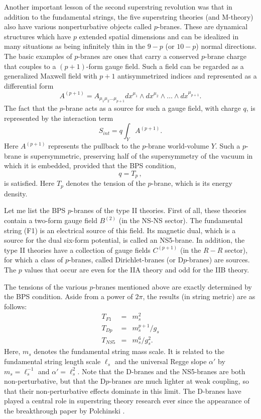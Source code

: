 \documentclass[a4paper,12pt]{article}
\begin{document}
Another important lesson of the second superstring revolution was
that in addition to the fundamental strings, the five superstring
theories (and M-theory) also have various nonperturbative objects
called $p$-branes.  These are dynamical structures which have $p$
extended spatial dimensions and can be idealized in many
situations as being infinitely thin in the $9 - p$ (or $10-p$)
normal directions. The basic examples of $p$-branes are ones that
carry a conserved $p$-brane charge that couples to a $(p +
1)$-form gauge field. Such a field can be regarded as a
generalized Maxwell field with $p+1$ antisymmetrized indices and
represented as a differential form
\begin{equation}
A^{(p+1)} = A_{\mu_{1}\mu_{2}\ldots \mu_{p+1}} dx^{\mu_{1}} \wedge dx^{\mu_{2}}
\wedge\ldots \wedge dx^{\mu_{p+1}}.
\end{equation}
The fact that the $p$-brane acts as a source for such a gauge field, with
charge $q$, is represented by the interaction term
\begin{equation}
S_{int} = q \int_Y A^{(p + 1)}.
\end{equation}
Here $A^{(p+1)}$ represents the pullback to the $p$-brane
world-volume $Y$. Such a $p$-brane is supersymmetric, preserving
half of the supersymmetry of the vacuum in which it is embedded,
provided that the BPS condition,
\begin{equation}
q = T_p \, ,
\end{equation}
is satisfied.  Here $T_p$ denotes the tension of the $p$-brane, which is its
energy density.

Let me list the BPS $p$-branes of the type II theories.  First of
all, these theories contain a two-form gauge field $B^{(2)}$ (in
the NS-NS sector).  The fundamental string (F1) is an electrical
source of this field.  Its magnetic dual, which is a source for
the dual six-form potential, is called an NS5-brane. In addition,
the type II theories have a collection of gauge fields $C^{(p+1)}$
(in the $R-R$ sector), for which a class of $p$-branes, called
Dirichlet-branes (or D$p$-branes) are sources. The $p$ values that
occur are even for the IIA theory and odd for the IIB theory.

The tensions of the various $p$-branes mentioned above are exactly determined
by the BPS condition.  Aside from a power of $2\pi$, the results (in string
metric) are as follows:
\begin{eqnarray}
T_{F1} &=& m_s^2\nonumber \\
T_{Dp} &=& m_s^{p+1}/g_s\nonumber \\
T_{NS5} &=& m_s^6/g_s^2.
\end{eqnarray}
Here, $m_s$ denotes the fundamental string mass scale.  It is
related to the fundamental string length scale $\ell_s$ and the
universal Regge slope $\alpha'$ by $m_s = \ell_s^{-1}$ and
$\alpha' = \ell_s^2$.  Note that the D-branes and the NS5-branes
are both non-perturbative, but that the D$p$-branes are much
lighter at weak coupling, so that their non-perturbative effects
dominate in this limit.  The D-branes have played a central role
in superstring theory research ever since the appearance of the
breakthrough paper by Polchinski \cite{JPD}.
\end{document}
